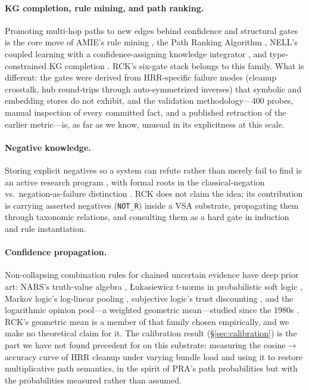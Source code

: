 \documentclass[11pt]{article}
\begin{document}
\paragraph{KG completion, rule mining, and path ranking.} Promoting
multi-hop paths to new edges behind confidence and structural gates
is the core move of AMIE's rule mining \cite{galarraga2013amie}, the
Path Ranking Algorithm \cite{lao2010pra, lao2011}, NELL's coupled
learning with a confidence-assigning knowledge integrator
\cite{carlson2010nell}, and type-constrained KG completion
\cite{krompass2015}. RCK's six-gate stack belongs to this family.
What is different: the gates were derived from HRR-specific failure
modes (cleanup crosstalk, hub round-trips through auto-symmetrized
inverses) that symbolic and embedding stores do not exhibit, and the
validation methodology---400 probes, manual inspection of every
committed fact, and a published retraction of the earlier
metric---is, as far as we know, unusual in its explicitness at this
scale.

\paragraph{Negative knowledge.} Storing explicit negatives so a
system can refute rather than merely fail to find is an active
research program \cite{arnaout2020, safavi2021negater}, with formal
roots in the classical-negation vs.\ negation-as-failure distinction
\cite{clark1978, gelfond1991}. RCK does not claim the idea; its
contribution is carrying asserted negatives (\texttt{NOT\_R}) inside
a VSA substrate, propagating them through taxonomic relations, and
consulting them as a hard gate in induction and rule instantiation.

\paragraph{Confidence propagation.} Non-collapsing combination rules
for chained uncertain evidence have deep prior art: NARS's
truth-value algebra \cite{wang2006}, {\L}ukasiewicz t-norms in
probabilistic soft logic \cite{bach2017psl}, Markov logic's
log-linear pooling \cite{richardson2006mln}, subjective logic's
trust discounting \cite{josang2016}, and the logarithmic opinion
pool---a weighted geometric mean---studied since the 1980s
\cite{genest1986}. RCK's geometric mean is a member of that family
chosen empirically, and we make no theoretical claim for it. The
calibration result (\S\ref{sec:calibration}) is the part we have not
found precedent for on this substrate: measuring the
cosine$\to$accuracy curve of HRR cleanup under varying bundle load
and using it to restore multiplicative path semantics, in the spirit
of PRA's path probabilities \cite{lao2010pra} but with the
probabilities measured rather than assumed.
\end{document}
